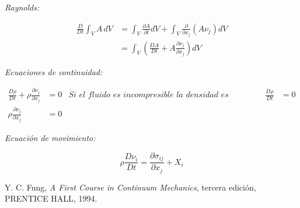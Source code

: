 \documentclass[a4paper,10pt,twoside,final,spanish]{article}
\begin{document}
\vspace{1em}

\textit{Raynolds:}

\begin{align}
\frac{D}{Dt}\int_{V}A\,dV
&= \int_{V}\frac{\partial A}{\partial t}dV
+\int_{V}\frac{\partial}{\partial x_{j}}(A\nu_{j})dV \\
&= \int_{V}\left(\frac{DA}{Dt}+A\frac{\partial\nu_{j}}{\partial x_{j}}\right)dV
\end{align}

\vspace{1em}

\textit{Ecuaciones de continuidad:}

\begin{align}
\frac{D\rho}{Dt}+\rho\frac{\partial\nu_{j}}{\partial x_{j}} &= 0
& \textit{Si el fluido es incompresible la densidad es constante.}
&& \frac{D\rho}{Dt} &= 0 \\
\rho\frac{\partial\nu_{j}}{\partial x_{j}} &= 0
\end{align}

\vspace{1em}

\textit{Ecuación de movimiento:}

\begin{equation}
\rho\frac{D\nu_{i}}{Dt}=\frac{\partial\sigma_{ij}}{\partial x_{j}}+X_{i}
\label{eq:em}
\end{equation}


\begin{thebibliography}{99}
Y. C. Fung,
\emph{A First Course in Continuum Mechanics}, 
tercera edición,
PRENTICE HALL,
1994.
\end{thebibliography}
\end{document}
